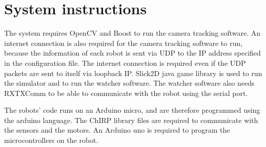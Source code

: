 \chapter{System instructions}

The system requires OpenCV and Boost to run the camera tracking software. An internet connection is also required for the camera tracking software to run, because the information of each robot is sent via UDP to the IP address specified in the configuration file. The internet connection is required even if the UDP packets are sent to itself via loopback IP.
Slick2D java game library is used to run the simulator and to run the watcher software. 
The watcher software also needs RXTXComm to be able to communicate with the robot using the serial port.

The robots' code runs on an Arduino micro, and are therefore programmed using the arduino language. The ChIRP library files are required to communicate with the sensors and the motors. An Arduino uno is required to program the microcontrollers on the robot.